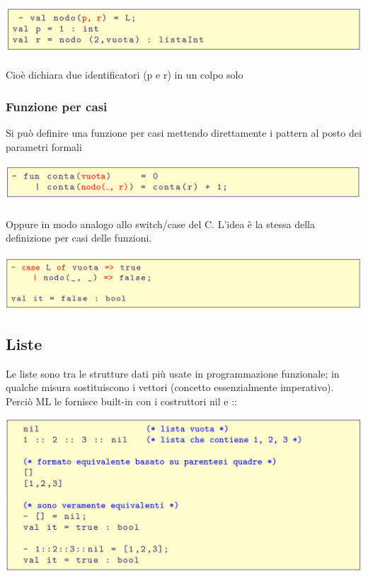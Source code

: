 \documentclass[10pt]{article}
\begin{document}
\includegraphics[scale=0.2]{Immagini/ml22.png}
\\\\
Cioè dichiara due identificatori (p e r) in un colpo solo
\subsubsection{Funzione per casi}
Si può definire una funzione per casi mettendo direttamente i pattern al posto dei parametri formali

\includegraphics[scale=0.2]{Immagini/ml23.png}
\\\\
Oppure in modo analogo allo switch/case del C.
L’idea è la stessa della definizione per casi delle funzioni.

\includegraphics[scale=0.2]{Immagini/ml24.png}
\subsection{Liste}
Le liste sono tra le strutture dati più usate in programmazione
funzionale; in qualche misura sostituiscono i vettori (concetto
essenzialmente imperativo).
Perciò ML le fornisce built-in con i costruttori nil e ::

\includegraphics[scale=0.2]{Immagini/ml25.png}
\end{document}
